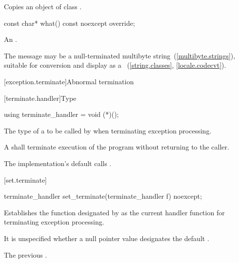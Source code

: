 \begin{itemdescr}
\pnum
\effects
Copies an object of class
.
\end{itemdescr}

%
%
\begin{itemdecl}
const char* what() const noexcept override;
\end{itemdecl}

\begin{itemdescr}
\pnum
\returns
An  \ntbs.

\pnum
\remarks
The message may be a null-terminated multibyte string~(\ref{multibyte.strings}),
suitable for conversion and display as a
~(\ref{string.classes}, \ref{locale.codecvt}).
\end{itemdescr}

[exception.terminate]{Abnormal termination}

[terminate.handler]{Type }

%
\begin{itemdecl}
using terminate_handler = void (*)();
\end{itemdecl}

\begin{itemdescr}
\pnum
The type of a
to be called by
%
when terminating exception processing.

\pnum
\required
A  shall
terminate execution of the program without returning to the caller.

\pnum
{}
The implementation's default  calls
.%
\end{itemdescr}

[set.terminate]{}

%
\begin{itemdecl}
terminate_handler set_terminate(terminate_handler f) noexcept;
\end{itemdecl}

\begin{itemdescr}
\pnum
\effects
Establishes the function designated by  as the current
handler function for terminating exception processing.

\pnum
\remarks It is unspecified whether a null pointer value designates the default
.

\pnum
\returns
The previous .
\end{itemdescr}

